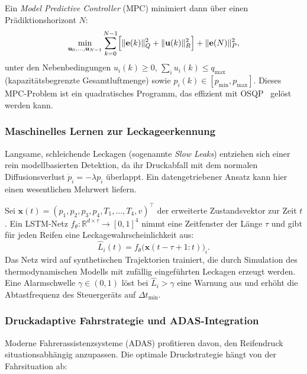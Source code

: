 ﻿\documentclass[a4paper,12pt]{article}
\theoremstyle{definition}
\begin{document}
Ein \emph{Model Predictive Controller} (MPC) minimiert dann über einen
Prädiktionshorizont $N$:
\[
    \min_{\mathbf{u}_0, \ldots, \mathbf{u}_{N-1}}
    \sum_{k=0}^{N-1}\Bigl[\|\mathbf{e}(k)\|_Q^2
    + \|\mathbf{u}(k)\|_R^2\Bigr]
    + \|\mathbf{e}(N)\|_P^2,
\]
unter den Nebenbedingungen
$u_i(k) \geq 0$, $\sum_i u_i(k) \leq q_{\max}$ (kapazitätsbegrenzte
Gesamtluftmenge) sowie $p_i(k) \in [p_{\min}, p_{\max}]$.
Dieses MPC-Problem ist ein quadratisches Programm, das effizient mit
OSQP~\cite{osqp2020} gelöst werden kann.

\subsubsection{Maschinelles Lernen zur Leckageerkennung}

Langsame, schleichende Leckagen (sogenannte \emph{Slow Leaks}) entziehen sich
einer rein modellbasierten Detektion, da ihr Druckabfall mit dem normalen
Diffusionsverlust $\dot{p}_i = -\lambda p_i$ überlappt. Ein datengetriebener
Ansatz kann hier einen wesentlichen Mehrwert liefern.

Sei $\mathbf{x}(t) = (p_1, p_2, p_3, p_4, T_1, \ldots, T_4, v)^{\top}$
der erweiterte Zustandsvektor zur Zeit $t$. Ein LSTM-Netz
$f_\theta: \mathbb{R}^{d \times \tau} \to [0,1]^4$ nimmt eine Zeitfenster
der Länge $\tau$ und gibt für jeden Reifen eine Leckagewahr\-scheinlichkeit aus:
\[
    \hat{L}_i(t) = f_\theta\bigl(\mathbf{x}(t-\tau+1:t)\bigr)_i.
\]
Das Netz wird auf synthetischen Trajektorien trainiert, die durch Simulation
des thermodynamischen Modells mit zufällig eingeführten Leckagen erzeugt werden.
Eine Alarmschwelle $\gamma \in (0,1)$ löst bei $\hat{L}_i > \gamma$ eine
Warnung aus und erhöht die Abtastfrequenz des Steuergeräts auf $\Delta t_{\min}$.

\subsubsection{Druckadaptive Fahrstrategie und ADAS-Integration}

Moderne Fahrerassistenzsysteme (ADAS) profitieren davon, den Reifendruck
situationsabhängig anzupassen. Die optimale Druckstrategie hängt von der
Fahrsituation ab:
\end{document}
